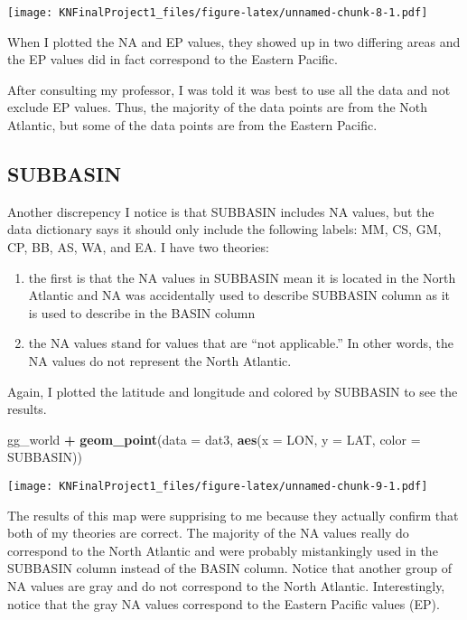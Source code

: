 \documentclass[
]{article}
\newenvironment{Shaded}{\begin{snugshade}}{\end{snugshade}}
\newcommand{\DataTypeTok}[1]{\textcolor[rgb]{0.13,0.29,0.53}{#1}}
\newcommand{\KeywordTok}[1]{\textcolor[rgb]{0.13,0.29,0.53}{\textbf{#1}}}
\newcommand{\NormalTok}[1]{#1}
\newcommand{\OperatorTok}[1]{\textcolor[rgb]{0.81,0.36,0.00}{\textbf{#1}}}
\newcommand{\StringTok}[1]{\textcolor[rgb]{0.31,0.60,0.02}{#1}}
\providecommand{\tightlist}{%
  \setlength{\itemsep}{0pt}\setlength{\parskip}{0pt}}
\begin{document}
\texttt{[image: KNFinalProject1\_files/figure-latex/unnamed-chunk-8-1.pdf]}

When I plotted the NA and EP values, they showed up in two differing
areas and the EP values did in fact correspond to the Eastern Pacific.

After consulting my professor, I was told it was best to use all the
data and not exclude EP values. Thus, the majority of the data points
are from the Noth Atlantic, but some of the data points are from the
Eastern Pacific.

\hypertarget{subbasin}{%
\subsection{SUBBASIN}\label{subbasin}}

Another discrepency I notice is that SUBBASIN includes NA values, but
the data dictionary says it should only include the following labels:
MM, CS, GM, CP, BB, AS, WA, and EA. I have two theories:

\begin{enumerate}
\def\labelenumi{\arabic{enumi})}
\tightlist
\item
  the first is that the NA values in SUBBASIN mean it is located in the
  North Atlantic and NA was accidentally used to describe SUBBASIN
  column as it is used to describe in the BASIN column
\item
  the NA values stand for values that are ``not applicable.'' In other
  words, the NA values do not represent the North Atlantic.
\end{enumerate}

Again, I plotted the latitude and longitude and colored by SUBBASIN to
see the results.

\begin{Shaded}
\begin{Highlighting}[]
\NormalTok{gg_world }\OperatorTok{+}\StringTok{ }
\StringTok{  }\KeywordTok{geom_point}\NormalTok{(}\DataTypeTok{data =}\NormalTok{ dat3, }\KeywordTok{aes}\NormalTok{(}\DataTypeTok{x =}\NormalTok{ LON, }\DataTypeTok{y =}\NormalTok{ LAT, }\DataTypeTok{color =}\NormalTok{ SUBBASIN))}
\end{Highlighting}
\end{Shaded}

\texttt{[image: KNFinalProject1\_files/figure-latex/unnamed-chunk-9-1.pdf]}

The results of this map were supprising to me because they actually
confirm that both of my theories are correct. The majority of the NA
values really do correspond to the North Atlantic and were probably
mistankingly used in the SUBBASIN column instead of the BASIN column.
Notice that another group of NA values are gray and do not correspond to
the North Atlantic. Interestingly, notice that the gray NA values
correspond to the Eastern Pacific values (EP).
\end{document}
